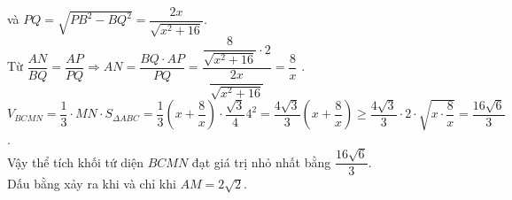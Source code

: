 \begin{ex}
{		và $PQ=\sqrt{P{B^2}-B{Q^2}}=\dfrac{2x}{\sqrt{x^2+16}}$.\\
		Từ $\dfrac{AN}{BQ}=\dfrac{AP}{PQ}\Rightarrow AN=\dfrac{BQ\cdot AP}{PQ}=\dfrac{\dfrac{8}{\sqrt{x^2+16}}\cdot 2}{\dfrac{2x}{\sqrt{x^2+16}}}=\dfrac{8}{x}$ .\\
		$V_{BCMN}=\dfrac{1}{3}\cdot MN\cdot S_{\Delta ABC}=\dfrac{1}{3}\left(x+\dfrac{8}{x}\right)\cdot\dfrac{\sqrt{3}}{4}{4^2}=\dfrac{4\sqrt{3}}{3}\left(x+\dfrac{8}{x}\right)\ge\dfrac{4\sqrt{3}}{3}\cdot2\cdot\sqrt{x\cdot\dfrac{8}{x}}=\dfrac{16\sqrt{6}}{3}$.\\       
		Vậy thể tích khối tứ diện $ BCMN$ đạt giá trị nhỏ nhất bằng $\dfrac{16\sqrt{6}}{3}$.\\
		Dấu bằng xảy ra khi và chỉ khi $ AM=2\sqrt{2}$.
	}       
\end{ex}

